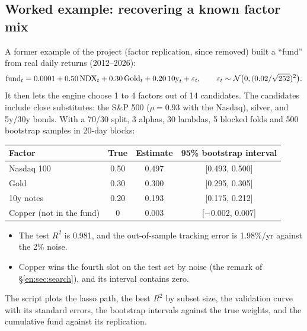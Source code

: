 \subsection{Worked example: recovering a known factor mix}
A former example of the project (factor replication, since removed) built a ``fund'' from real daily returns
(2012--2026):
\[
  \text{fund}_t=0.0001+0.50\,\text{NDX}_t+0.30\,\text{Gold}_t+0.20\,\text{10y}_t+\varepsilon_t,
  \qquad\varepsilon_t\sim\mathcal{N}\big(0,(0.02/\sqrt{252})^2\big).
\]
It then lets the engine choose 1 to 4 factors out of 14 candidates. The candidates include
close substitutes: the S\&P 500 ($\rho=0.93$ with the Nasdaq), silver, and 5y/30y bonds.
With a 70/30 split, 3 alphas, 30 lambdas, 5 blocked folds and 500 bootstrap samples in
20-day blocks:
\begin{center}\small
\begin{tabular}{@{}lccc@{}}
\toprule
Factor & True & Estimate & 95\% bootstrap interval \\
\midrule
Nasdaq 100 & 0.50 & 0.497 & [0.493, 0.500] \\
Gold & 0.30 & 0.300 & [0.295, 0.305] \\
10y notes & 0.20 & 0.193 & [0.175, 0.212] \\
Copper (not in the fund) & 0 & 0.003 & [$-0.002$, 0.007] \\
\bottomrule
\end{tabular}
\end{center}
\begin{itemize}
  \item The test $R^2$ is 0.981, and the out-of-sample tracking error is 1.98\%/yr against
        the 2\% noise.
  \item Copper wins the fourth slot on the test set by noise (the remark of
        \S\ref{en:sec:search}), and its interval contains zero.
\end{itemize}
The script plots the lasso path, the best $R^2$ by subset size, the validation curve with
its standard errors, the bootstrap intervals against the true weights, and the cumulative
fund against its replication.

